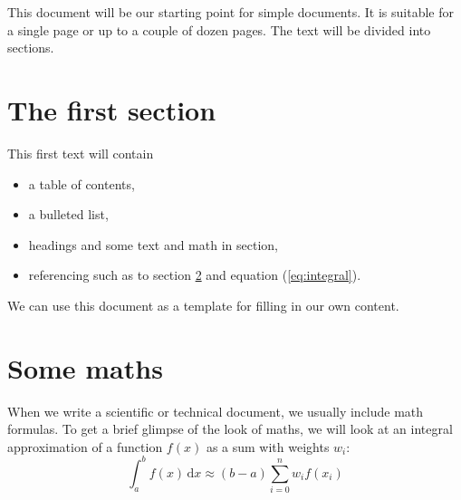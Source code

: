 \documentclass[paper=a4,oneside,fontsize=12pt,parskip=full]{scrartcl}
\begin{document}
\tableofcontents
{}
This document will be our starting point for simple documents. It
is suitable for a single page or up to a couple of dozen pages.
The text will be divided into sections.
\section{The first section}
This first text will contain
\begin{itemize}
	\item a table of contents,
	\item a bulleted list,
	\item headings and some text and math in section,
	\item referencing such as to section \ref{sec:maths} and
		equation (\ref{eq:integral}).
\end{itemize}
We can use this document as a template for filling in our own
content.
\section{Some maths}
\label{sec:maths}
When we write a scientific or technical document, we
usually include math formulas. To get a brief glimpse
of the look of maths, we will look at an integral
approximation of a function \( f(x) \) as a sum with
weights \( w_i \):
\begin{equation}
\label{eq:integral}
\int_a^b f(x)\,\mathrm{d}x \approx (b-a)
\sum_{i=0}^n w_i f(x_i)
\end{equation}
\end{document}
